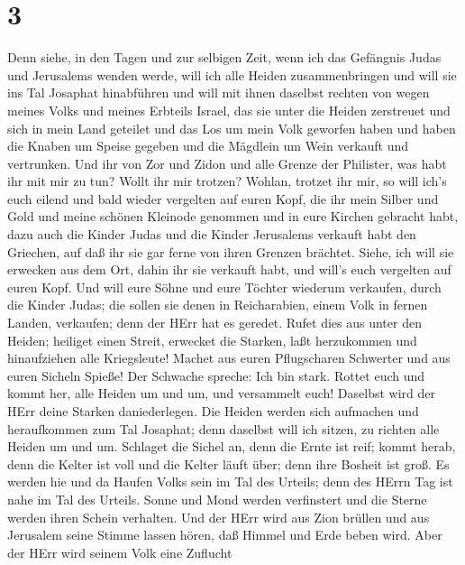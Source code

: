 \hypertarget{section-2}{%
\section{3}\label{section-2}}

 Denn siehe, in den Tagen und zur selbigen Zeit, wenn ich
das Gefängnis Judas und Jerusalems wenden werde,  will ich
alle Heiden zusammenbringen und will sie ins Tal Josaphat hinabführen
und will mit ihnen daselbst rechten von wegen meines Volks und meines
Erbteils Israel, das sie unter die Heiden zerstreuet und sich in mein
Land geteilet  und das Los um mein Volk geworfen haben und
haben die Knaben um Speise gegeben und die Mägdlein um Wein verkauft und
vertrunken.  Und ihr von Zor und Zidon und alle Grenze der
Philister, was habt ihr mit mir zu tun? Wollt ihr mir trotzen? Wohlan,
trotzet ihr mir, so will ich's euch eilend und bald wieder vergelten auf
euren Kopf,  die ihr mein Silber und Gold und meine schönen
Kleinode genommen und in eure Kirchen gebracht habt,  dazu
auch die Kinder Judas und die Kinder Jerusalems verkauft habt den
Griechen, auf daß ihr sie gar ferne von ihren Grenzen brächtet.
 Siehe, ich will sie erwecken aus dem Ort, dahin ihr sie
verkauft habt, und will's euch vergelten auf euren Kopf. 
Und will eure Söhne und eure Töchter wiederum verkaufen, durch die
Kinder Judas; die sollen sie denen in Reicharabien, einem Volk in fernen
Landen, verkaufen; denn der HErr hat es geredet.  Rufet dies
aus unter den Heiden; heiliget einen Streit, erwecket die Starken, laßt
herzukommen und hinaufziehen alle Kriegsleute!  Machet aus
euren Pflugscharen Schwerter und aus euren Sicheln Spieße! Der Schwache
spreche: Ich bin stark.  Rottet euch und kommt her, alle
Heiden um und um, und versammelt euch! Daselbst wird der HErr deine
Starken daniederlegen.  Die Heiden werden sich aufmachen
und heraufkommen zum Tal Josaphat; denn daselbst will ich sitzen, zu
richten alle Heiden um und um.  Schlaget die Sichel an,
denn die Ernte ist reif; kommt herab, denn die Kelter ist voll und die
Kelter läuft über; denn ihre Bosheit ist groß.  Es werden
hie und da Haufen Volks sein im Tal des Urteils; denn des HErrn Tag ist
nahe im Tal des Urteils.  Sonne und Mond werden verfinstert
und die Sterne werden ihren Schein verhalten.  Und der HErr
wird aus Zion brüllen und aus Jerusalem seine Stimme lassen hören, daß
Himmel und Erde beben wird. Aber der HErr wird seinem Volk eine Zuflucht
